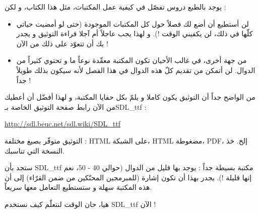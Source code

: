 يوجد بالطبع دروس تفصّل في كيفية عمل المكتبات، مثل هذا الكتاب، و لكن :

\begin{itemize}
	\item لن أستطيع أن أضع لك فصلاً حول كل المكتبات الموجودة (حتى لو أمضيت حياتي كلّها في ذلك، لن يكفيني الوقت !). و لهذا يجب عاجلاً أم آجلا قراءة التوثيق و يجدر بك أن تتعوّد على ذلك من الآن !
	\item من جهة أخرى، في غالب الأحيان تكون المكتبة معقّدة نوعاً ما و تحتوي كثيراً من الدوال. لن أتمكن من تقديم كلّ هذه الدوال في هذا الفصل لأنه سيكون بذلك طويلاً جداً !
\end{itemize}

من الواضح جداً أن التوثيق يكون كاملا و يلمّ بكل حفايا المكتبة، و لهذا أفضّل أن أعطيك من الآن رابط صفحة التوثيق الخاصة بـ\textenglish{SDL\_ttf} :

\url{http://sdl.beuc.net/sdl.wiki/SDL_ttf}

التوثيق متوفّر بصيغ مختلفة : 
\textenglish{HTML}
على الشبكة، 
\textenglish{HTML}
مضغوطة،
\textenglish{PDF}،
إلخ. خذ النسخة التي تناسبك.

ستجد بأن
\textenglish{SDL\_ttf}
مكتبة بسيطة جداً : يوجد بها قليل من الدوال (حوالي 40 - 50، نعم إنها قليلة !). يجدر بهذا أن تكون إشارة (للمبرمجين المحنّكين من ضمن القرّاء) إلى أن هذه المكتبة سهلة و ستستطيع التعامل معها سريعاً.

هيا، حان الوقت لنتعلّم كيف نستخدم
\textenglish{SDL\_ttf}
الآن !
